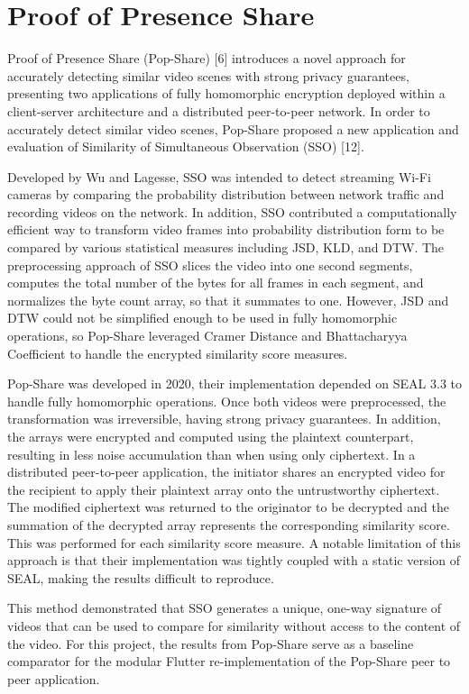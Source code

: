 \section{Proof of Presence Share}

Proof of Presence Share (Pop-Share) [6] introduces a novel approach for accurately detecting similar video scenes with strong privacy guarantees, presenting two applications of fully homomorphic encryption deployed within a client-server architecture and a distributed peer-to-peer network. In order to accurately detect similar video scenes, Pop-Share proposed a new application and evaluation of Similarity of Simultaneous Observation (SSO) [12]. 

Developed by Wu and Lagesse, SSO was intended to detect streaming Wi-Fi cameras by comparing the probability distribution between network traffic and recording videos on the network. In addition, SSO contributed a computationally efficient way to transform video frames into probability distribution form to be compared by various statistical measures including JSD, KLD, and DTW. The preprocessing approach of SSO slices the video into one second segments, computes the total number of the bytes for all frames in each segment, and normalizes the byte count array, so that it summates to one. However, JSD and DTW could not be simplified enough to be used in fully homomorphic operations, so Pop-Share leveraged Cramer Distance and Bhattacharyya Coefficient to handle the encrypted similarity score measures.

Pop-Share was developed in 2020, their implementation depended on SEAL 3.3 to handle fully homomorphic operations. Once both videos were preprocessed, the transformation was irreversible, having strong privacy guarantees. In addition, the arrays were encrypted and computed using the plaintext counterpart, resulting in less noise accumulation than when using only ciphertext. In a distributed peer-to-peer application, the initiator shares an encrypted video for the recipient to apply their plaintext array onto the untrustworthy ciphertext. The modified ciphertext was returned to the originator to be decrypted and the summation of the decrypted array represents the corresponding similarity score. This was performed for each similarity score measure. A notable limitation of this approach is that their implementation was tightly coupled with a static version of SEAL, making the results difficult to reproduce.

This method demonstrated that SSO generates a unique, one-way signature of videos that can be used to compare for similarity without access to the content of the video. For this project, the results from Pop-Share serve as a baseline comparator for the modular Flutter re-implementation of the Pop-Share peer to peer application.

